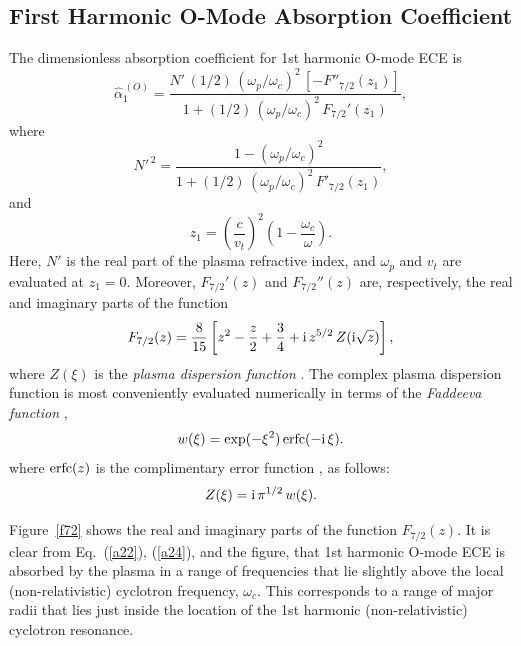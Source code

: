 \documentclass{iopjournal}
\begin{document}
{\subsection{First Harmonic O-Mode Absorption Coefficient} 
The dimensionless absorption coefficient for 1st harmonic O-mode ECE is \cite{bornatici}
\begin{equation}\label{a22}
\hat{\alpha}_1^{\,(O)}=\frac{N'\,(1/2)\,(\omega_p/\omega_c)^2\,[-F''_{7/2}(z_1)]}{1+(1/2)\,(\omega_p/\omega_c)^2\,F_{7/2}'(z_1)},
\end{equation}
where
\begin{equation}
N'^{\,2}=\frac{1-(\omega_p/\omega_c)^2}{1+(1/2)\,(\omega_p/\omega_c)^2\,F'_{7/2}(z_1)},
\end{equation}
and
\begin{equation}\label{a24}
z_1=\left(\frac{c}{v_t}\right)^2\left(1-\frac{\omega_c}{\omega}\right).
\end{equation}
Here, $N'$ is the real part of the plasma refractive index, and $\omega_p$ and $v_t$ are evaluated at $z_1=0$. Moreover,
$F_{7/2}'(z)$ and $F_{7/2}''(z)$ are, respectively,  the real and imaginary parts of
the function \cite{bornatici}
\begin{equation}
F_{7/2}(z) =\frac{8}{15}\left[z^2-\frac{z}{2}+\frac{3}{4}+{\rm i}\,z^{5/2}\,Z({\rm i}\sqrt{z})\right],
\end{equation}
where $Z(\xi)$ is the {\em plasma dispersion function} \cite{plasma}. The complex plasma dispersion function is most conveniently evaluated numerically 
in terms of the {\em Faddeeva function}\/ \cite{faddeeva}, 
\begin{equation}
w(\xi) = \exp(-\xi^2)\,{\rm erfc}(-{\rm i}\,\xi).
\end{equation}
where ${\rm erfc}(z)$ is the complimentary error function \cite{as},  
as follows:
\begin{equation}
Z(\xi)= {\rm i}\,\pi^{1/2}\,w(\xi).
\end{equation}

 Figure~\ref{f72} shows the real and imaginary parts of the function $F_{7/2}(z)$. It is clear from Eq.~(\ref{a22}),
(\ref{a24}), and the figure, that 1st harmonic O-mode  ECE is absorbed by the plasma in a range of frequencies that lie slightly above the local (non-relativistic) cyclotron frequency,
$\omega_c$. This corresponds to a range of major radii that lies just inside the location of the 1st harmonic (non-relativistic) cyclotron resonance. 

}
\end{document}
